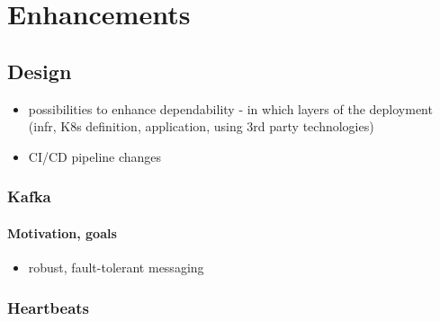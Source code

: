 \chapter{Enhancements}

\section{Design}

\begin{itemize}
	\item possibilities to enhance dependability - in which layers of the deployment (infr, K8s definition, application, using 3rd party technologies)
	\item CI/CD pipeline changes
\end{itemize}

\subsection{Kafka}

\subsubsection{Motivation, goals}

\begin{itemize}
	\item robust, fault-tolerant messaging
\end{itemize}

\subsection{Heartbeats}

